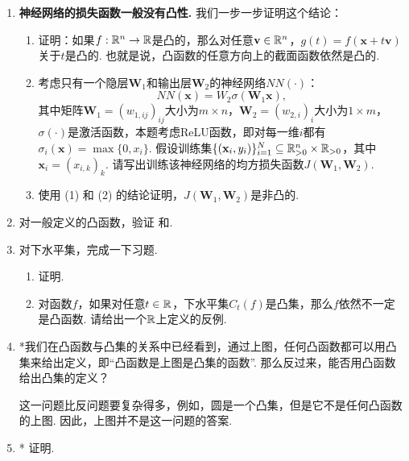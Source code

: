 \begin{enumerate}[wide, labelindent=0pt]
    \item \textbf{神经网络的损失函数一般没有凸性.} 我们一步一步证明这个结论：
        \begin{enumerate}
            \item 证明：如果$f:\mathbb{R}^n\to \mathbb{R}$是凸的，那么对任意$\mathbf v\in\mathbb{R}^n$，$g(t) = f(\mathbf x+t\mathbf v)$关于$t$是凸的. 也就是说，凸函数的任意方向上的截面函数依然是凸的.
            \item 考虑只有一个隐层$\mathbf W_1$和输出层$\mathbf W_2$的神经网络$NN(\cdot)$：
            \[NN(\mathbf{x})= W_2\sigma(\mathbf W_1\mathbf{x}),\]
            其中矩阵$\mathbf W_1=(w_{1,ij})_{ij}$大小为$m\times n$，$\mathbf W_2=(w_{2,i})_i$大小为$1\times m$，$\sigma(\cdot)$是激活函数，本题考虑ReLU函数，即对每一维$i$都有$\sigma_i(\mathbf x)=\max\{0,x_i\}$. 假设训练集$\{(\mathbf{x}_i,y_i)\}_{i=1}^N\subseteq \mathbb{R}_{>0}^n\times \mathbb{R}_{>0}$，其中$\mathbf x_i=(x_{i,k})_k$. 请写出训练该神经网络的均方损失函数$J(\mathbf W_1,\mathbf W_2)$.
            \item 使用 (1) 和 (2) 的结论证明，$J(\mathbf W_1,\mathbf W_2)$是非凸的.
        \end{enumerate}

    \item \label{exercise:convex-function-general-property} 对一般定义的凸函数，验证 和.
    
    \item \label{exercise:convex-level-set} 对下水平集，完成一下习题. 
    \begin{enumerate}
        \item 证明. 
        \item 对函数$f$，如果对任意$t\in\mathbb{R}$，下水平集$C_t(f)$是凸集，那么$f$依然不一定是凸函数. 请给出一个$\mathbb{R}$上定义的反例.
    \end{enumerate}
    
    \item *我们在凸函数与凸集的关系中已经看到，通过上图，任何凸函数都可以用凸集来给出定义，即“凸函数是上图是凸集的函数”. 那么反过来，能否用凸函数给出凸集的定义？
    \begin{hint}
        这一问题比反问题要复杂得多，例如，圆是一个凸集，但是它不是任何凸函数的上图. 因此，上图并不是这一问题的答案.
    \end{hint}
    
    \item *\label{exercise:Chebyshev-convex} 证明.
    

\end{enumerate}
